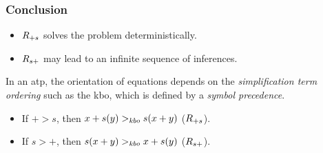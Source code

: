 \begin{frame}
\frametitle{Conclusion}
\begin{itemize}
\item $R_{+s}$ solves the problem deterministically.
\item $R_{s+}$ may lead to an infinite sequence of inferences.
\end{itemize}
\pause
In an \acrfull{atp}, the orientation of equations depends on the \emph{simplification term ordering}
such as the \acrfull{kbo},
which is defined by a \emph{symbol precedence}.

\begin{itemize}
\item If $+ > s$, then $x + s(y) >_{\mathit{kbo}} s(x + y)$ ($R_{+s}$).
\item If $s > +$, then $s(x + y) >_{\mathit{kbo}} x + s(y)$ ($R_{s+}$).
\end{itemize}
\end{frame}
